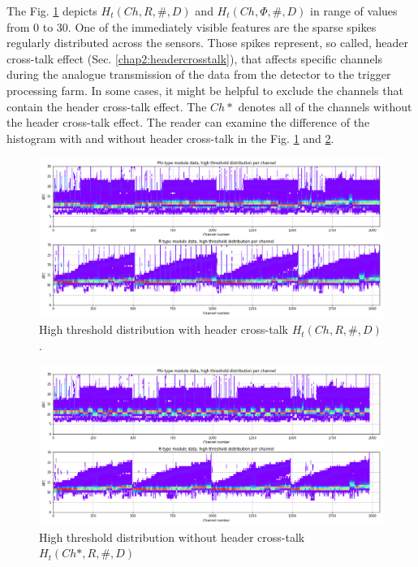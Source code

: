 The Fig. \ref{plot:P2-threshold-all-zoom} depicts $H_t(Ch, R, \#, D)$ and $H_t(Ch, \Phi, \#, D)$ in range of values from 0 to 30.
One of the immediately visible features are the sparse spikes regularly distributed across the sensors.
Those spikes represent, so called, header cross-talk effect (Sec. \ref{chap2:headercrosstalk}), that affects specific channels during the analogue transmission of the data from the detector to the trigger processing farm.
In some cases, it might be helpful to exclude the channels that contain the header cross-talk effect.
The $Ch*$ denotes all of the channels without the header cross-talk effect.
The reader can examine the difference of the histogram with and without header cross-talk in the Fig. \ref{plot:P2-threshold-all-zoom} and \ref{plot:P2-threshold-all-zoom-nohc}.


\begin{figure}
    \centering
    \includegraphics[width=0.7\linewidth]{figures/chapter4/calib_analysis/P2-threshold-all-zoom.png}
    \caption{High threshold distribution with header cross-talk $H_t(Ch, R, \#, D)$.}
    \label{plot:P2-threshold-all-zoom}
\end{figure}

\begin{figure}
    \centering
    \includegraphics[width=0.7\linewidth]{figures/chapter4/calib_analysis/P2-threshold-all-zoom-nohc.png}
    \caption{High threshold distribution without header cross-talk $H_t(Ch*, R, \#, D)$}
    \label{plot:P2-threshold-all-zoom-nohc}
\end{figure}


